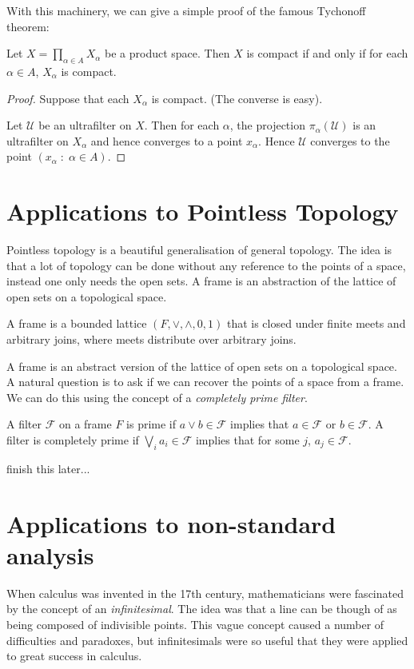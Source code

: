 \documentclass{owmaths}
\begin{document}
With this machinery, we can give a simple proof of the famous Tychonoff theorem:
\begin{theorem}
    Let $X = \prod_{\alpha \in A} X_\alpha$ be a product space. Then $X$
    is compact if and only if for each $\alpha \in A$, $X_\alpha$ is compact.
\end{theorem}
\begin{proof}
    Suppose that each $X_\alpha$ is compact. (The converse is easy).

    Let $\mathcal{U}$ be an ultrafilter on $X$. Then for each $\alpha$,
    the projection $\pi_\alpha(\mathcal{U})$ is an ultrafilter on $X_\alpha$
    and hence converges to a point $x_\alpha$. Hence $\mathcal{U}$
    converges to the point $(x_\alpha\;:\;\alpha\in A)$.
\end{proof}

\section{Applications to Pointless Topology}

Pointless topology is a beautiful generalisation of general topology. The idea
is that a lot of topology can be done without any reference to the points
of a space, instead one only needs the open sets. A frame is an abstraction
of the lattice of open sets on a topological space.
\begin{definition}
    A frame is a bounded lattice $(F,\vee,\wedge,0,1)$ that is closed under finite meets
    and arbitrary joins, where meets distribute over arbitrary joins.
\end{definition}
A frame is an abstract version of the lattice of open sets on a topological space.
A natural question is to ask if we can recover the points of a space from a frame.
We can do this using the concept of a \emph{completely prime filter}.
\begin{definition}
    A filter $\mathcal{F}$ on a frame $F$ is prime if $a \vee b \in \mathcal{F}$
    implies that $a \in \mathcal{F}$ or $b \in \mathcal{F}$. A filter
    is completely prime if $\bigvee_{i} a_i \in \mathcal{F}$ implies that for some $j$,
    $a_j \in \mathcal{F}$.
\end{definition}
finish this later...


\section{Applications to non-standard analysis}
When calculus was invented in the 17th century, mathematicians were
fascinated by the concept of an \emph{infinitesimal}. The idea 
was that a line can be though of as being composed of indivisible points. This
vague concept
caused a number of difficulties and paradoxes, but infinitesimals were so useful
that they were applied to great success in calculus. 
\end{document}
